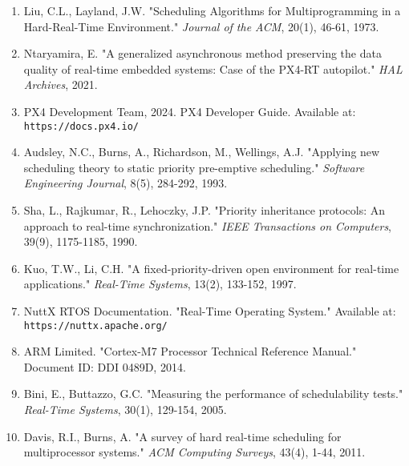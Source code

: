 \documentclass[12pt,a4paper]{article}
\begin{document}
\begin{enumerate}
\item Liu, C.L., Layland, J.W. "Scheduling Algorithms for Multiprogramming in a Hard-Real-Time Environment." \textit{Journal of the ACM}, 20(1), 46-61, 1973.

\item Ntaryamira, E. "A generalized asynchronous method preserving the data quality of real-time embedded systems: Case of the PX4-RT autopilot." \textit{HAL Archives}, 2021.

\item PX4 Development Team, 2024. PX4 Developer Guide. Available at: \texttt{https://docs.px4.io/}

\item Audsley, N.C., Burns, A., Richardson, M., Wellings, A.J. "Applying new scheduling theory to static priority pre-emptive scheduling." \textit{Software Engineering Journal}, 8(5), 284-292, 1993.

\item Sha, L., Rajkumar, R., Lehoczky, J.P. "Priority inheritance protocols: An approach to real-time synchronization." \textit{IEEE Transactions on Computers}, 39(9), 1175-1185, 1990.

\item Kuo, T.W., Li, C.H. "A fixed-priority-driven open environment for real-time applications." \textit{Real-Time Systems}, 13(2), 133-152, 1997.

\item NuttX RTOS Documentation. "Real-Time Operating System." Available at: \texttt{https://nuttx.apache.org/}

\item ARM Limited. "Cortex-M7 Processor Technical Reference Manual." Document ID: DDI 0489D, 2014.

\item Bini, E., Buttazzo, G.C. "Measuring the performance of schedulability tests." \textit{Real-Time Systems}, 30(1), 129-154, 2005.

\item Davis, R.I., Burns, A. "A survey of hard real-time scheduling for multiprocessor systems." \textit{ACM Computing Surveys}, 43(4), 1-44, 2011.

\end{enumerate}
\end{document}
